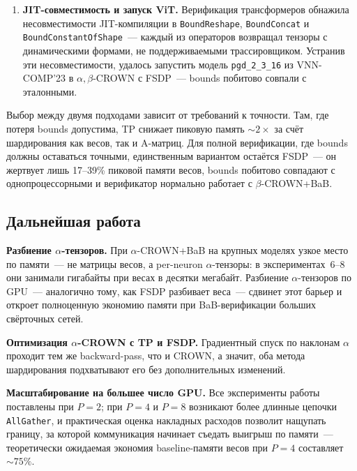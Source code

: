 \begin{enumerate}
    \item \textbf{JIT-совместимость и запуск ViT.}
    Верификация трансформеров обнажила несовместимости
    JIT-компиляции в \texttt{BoundReshape}, \texttt{BoundConcat}
    и \texttt{BoundConstantOfShape}~--- каждый из операторов
    возвращал тензоры с динамическими формами, не поддерживаемыми
    трассировщиком. Устранив эти несовместимости, удалось запустить
    модель \texttt{pgd\_2\_3\_16} из VNN-COMP'23 в $\alpha,\beta$-CROWN
    с FSDP~--- bounds побитово совпали с эталонными.

\end{enumerate}

Выбор между двумя подходами зависит от требований к точности.
Там, где потеря bounds допустима, TP снижает пиковую память
$\sim\!2\times$ за счёт шардирования как весов, так и A-матриц.
Для полной верификации, где bounds должны оставаться точными,
единственным вариантом остаётся FSDP~--- он жертвует лишь
17--39\% пиковой памяти весов, bounds побитово совпадают
с однопроцессорными и верификатор нормально работает
с $\beta$-CROWN+BaB.

\subsection{Дальнейшая работа}

\textbf{Разбиение $\alpha$-тензоров.}
При $\alpha$-CROWN+BaB на крупных моделях узкое место по памяти~---
не матрицы весов, а per-neuron $\alpha$-тензоры: в экспериментах~6--8
они занимали гигабайты при весах в десятки мегабайт.
Разбиение $\alpha$-тензоров по GPU~--- аналогично тому, как FSDP
разбивает веса~--- сдвинет этот барьер и откроет полноценную экономию
памяти при BaB-верификации больших свёрточных сетей.

\textbf{Оптимизация $\alpha$-CROWN с TP и FSDP.}
Градиентный спуск по наклонам $\alpha$ проходит тем же backward-pass,
что и CROWN, а значит, оба метода шардирования подхватывают его
без дополнительных изменений.

\textbf{Масштабирование на большее число GPU.}
Все эксперименты работы поставлены при $P = 2$; при $P = 4$ и $P = 8$
возникают более длинные цепочки \texttt{AllGather}, и практическая
оценка накладных расходов позволит нащупать границу, за которой
коммуникация начинает съедать выигрыш по памяти~--- теоретически
ожидаемая экономия baseline-памяти весов при $P = 4$ составляет
$\sim\!75\%$.
